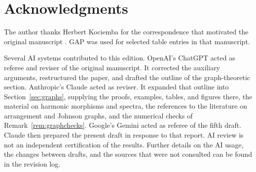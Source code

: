 \documentclass[12pt,letterpaper]{article}
\numberwithin{equation}{section}
\theoremstyle{definition}
\begin{document}
\section*{Acknowledgments}
The author thanks Herbert Kociemba for the correspondence that motivated the original manuscript \cite{Ko97}. GAP was used for selected table entries in that manuscript.

Several AI systems contributed to this edition. OpenAI's ChatGPT acted as referee and reviser of the original manuscript. It corrected the auxiliary arguments, restructured the paper, and drafted the outline of the graph-theoretic section. Anthropic's Claude acted as reviser. It expanded that outline into Section~\ref{sec:graphs}, supplying the proofs, examples, tables, and figures there, the material on harmonic morphisms and spectra, the references to the literature on arrangement and Johnson graphs, and the numerical checks of Remark~\ref{rem:graphchecks}. Google's Gemini acted as referee of the fifth draft. Claude then prepared the present draft in response to that report. AI review is not an independent certification of the results. Further details on the AI usage, the changes between drafts, and the sources that were not consulted can be found in the revision log.
\end{document}
